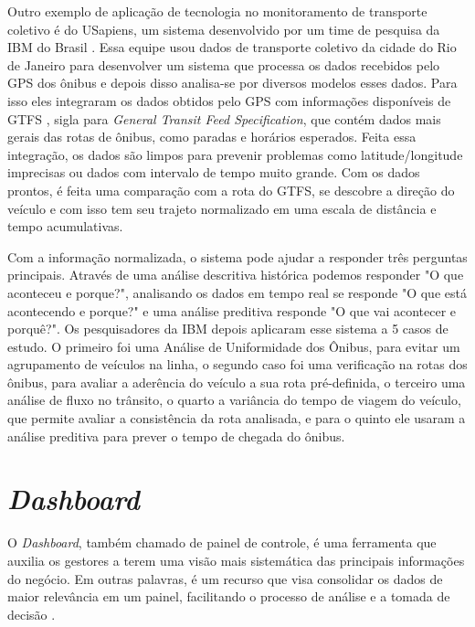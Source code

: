 \par Outro exemplo de aplicação de tecnologia no monitoramento de transporte coletivo é do USapiens, um sistema desenvolvido por um time de pesquisa da IBM do Brasil \cite{Vieira2015}. Essa equipe usou dados de transporte coletivo da cidade do Rio de Janeiro para desenvolver um sistema que processa os dados recebidos pelo GPS dos ônibus e depois disso analisa-se por diversos modelos esses dados. Para isso eles integraram os dados obtidos pelo GPS com informações disponíveis de GTFS \cite{GTFS}, sigla para \textit{General Transit Feed Specification}, que contém dados mais gerais das rotas de ônibus, como paradas e horários esperados. Feita essa integração, os dados são limpos para prevenir problemas como latitude/longitude imprecisas ou dados com intervalo de tempo muito grande. Com os dados prontos, é feita uma comparação com a rota do GTFS, se descobre a direção do veículo e com isso tem seu trajeto normalizado em uma escala de distância e tempo acumulativas.

\par Com a informação normalizada, o sistema pode ajudar a responder três perguntas principais. Através de uma análise descritiva histórica podemos responder "O que aconteceu e porque?", analisando os dados em tempo real se responde "O que está acontecendo e porque?" e uma análise preditiva responde "O que vai acontecer e porquê?". Os pesquisadores da IBM depois aplicaram esse sistema a 5 casos de estudo. O primeiro foi uma Análise de Uniformidade dos Ônibus, para evitar um agrupamento de veículos na linha, o segundo caso foi uma verificação na rotas dos ônibus, para avaliar a aderência do veículo a sua rota pré-definida, o terceiro uma análise de fluxo no trânsito, o quarto a variância do tempo de viagem do veículo, que permite avaliar a consistência da rota analisada, e para o quinto ele usaram a análise preditiva para prever o tempo de chegada do ônibus.

\section{\textit{Dashboard}}

\indent
\par O \textit{Dashboard}, também chamado de painel de controle, é uma ferramenta que auxilia os gestores a terem uma visão mais sistemática das principais informações do negócio. Em outras palavras, é um recurso que visa consolidar os dados de maior relevância em um painel, facilitando o processo de análise e a tomada de decisão \cite{Intelipost}.

